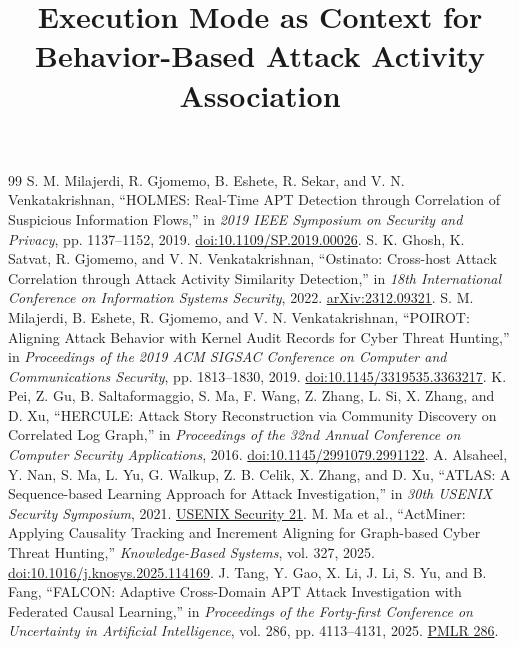 \documentclass[10pt]{article}
\title{Execution Mode as Context for Behavior-Based Attack Activity Association}
\author{}
\date{}
\begin{document}
\maketitle

\appendix

\begin{thebibliography}{99}
 S. M. Milajerdi, R. Gjomemo, B. Eshete, R. Sekar, and V. N. Venkatakrishnan, ``HOLMES: Real-Time APT Detection through Correlation of Suspicious Information Flows,'' in \emph{2019 IEEE Symposium on Security and Privacy}, pp. 1137--1152, 2019. \href{https://doi.org/10.1109/SP.2019.00026}{doi:10.1109/SP.2019.00026}.
 S. K. Ghosh, K. Satvat, R. Gjomemo, and V. N. Venkatakrishnan, ``Ostinato: Cross-host Attack Correlation through Attack Activity Similarity Detection,'' in \emph{18th International Conference on Information Systems Security}, 2022. \href{https://arxiv.org/abs/2312.09321}{arXiv:2312.09321}.
 S. M. Milajerdi, B. Eshete, R. Gjomemo, and V. N. Venkatakrishnan, ``POIROT: Aligning Attack Behavior with Kernel Audit Records for Cyber Threat Hunting,'' in \emph{Proceedings of the 2019 ACM SIGSAC Conference on Computer and Communications Security}, pp. 1813--1830, 2019. \href{https://doi.org/10.1145/3319535.3363217}{doi:10.1145/3319535.3363217}.
 K. Pei, Z. Gu, B. Saltaformaggio, S. Ma, F. Wang, Z. Zhang, L. Si, X. Zhang, and D. Xu, ``HERCULE: Attack Story Reconstruction via Community Discovery on Correlated Log Graph,'' in \emph{Proceedings of the 32nd Annual Conference on Computer Security Applications}, 2016. \href{https://doi.org/10.1145/2991079.2991122}{doi:10.1145/2991079.2991122}.
 A. Alsaheel, Y. Nan, S. Ma, L. Yu, G. Walkup, Z. B. Celik, X. Zhang, and D. Xu, ``ATLAS: A Sequence-based Learning Approach for Attack Investigation,'' in \emph{30th USENIX Security Symposium}, 2021. \href{https://www.usenix.org/conference/usenixsecurity21/presentation/alsaheel}{USENIX Security 21}.
 M. Ma et al., ``ActMiner: Applying Causality Tracking and Increment Aligning for Graph-based Cyber Threat Hunting,'' \emph{Knowledge-Based Systems}, vol. 327, 2025. \href{https://doi.org/10.1016/j.knosys.2025.114169}{doi:10.1016/j.knosys.2025.114169}.
 J. Tang, Y. Gao, X. Li, J. Li, S. Yu, and B. Fang, ``FALCON: Adaptive Cross-Domain APT Attack Investigation with Federated Causal Learning,'' in \emph{Proceedings of the Forty-first Conference on Uncertainty in Artificial Intelligence}, vol. 286, pp. 4113--4131, 2025. \href{https://proceedings.mlr.press/v286/tang25a.html}{PMLR 286}.

\end{thebibliography}
\end{document}
